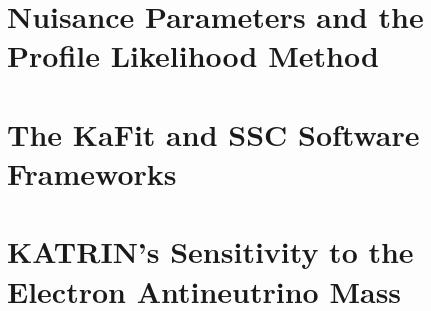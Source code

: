 \section{Nuisance Parameters and the Profile Likelihood Method}

\section{The KaFit and SSC Software Frameworks}

\section{KATRIN's Sensitivity to the Electron Antineutrino Mass}
